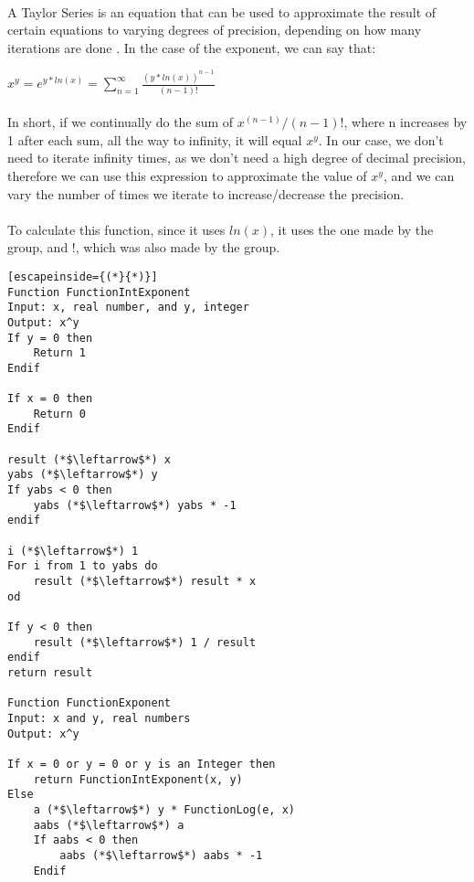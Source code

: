 \begin{itemize}
            \paragraph{}
            A Taylor Series is an equation that can be used to approximate the result of certain equations to varying degrees of precision, depending on how many iterations are done \cite{wikiS}. In the case of the exponent, we can say that:

            \begin{center}
                $x^y = e^{y*ln(x)} = \sum_{n=1}^{\infty}\frac{(y*ln(x))^{n-1}}{(n-1)!}$
            \end{center}

            \paragraph{}
            In short, if we continually do the sum of $x^(n-1)/(n-1)!$, where n increases by 1 after each sum, all the way to infinity, it will equal $x^y$. In our case, we don’t need to iterate infinity times, as we don’t need a high degree of decimal precision, therefore we can use this expression to approximate the value of $x^y$, and we can vary the number of times we iterate to increase/decrease the precision.

            \paragraph{}
        	To calculate this function, since it uses $ln(x)$, it uses the one made by the group, and !, which was also made by the group.

            \begin{lstlisting}[escapeinside={(*}{*)}]
Function FunctionIntExponent
Input: x, real number, and y, integer
Output: x^y
If y = 0 then
	Return 1
Endif

If x = 0 then
	Return 0
Endif

result (*$\leftarrow$*) x
yabs (*$\leftarrow$*) y
If yabs < 0 then
	yabs (*$\leftarrow$*) yabs * -1
endif

i (*$\leftarrow$*) 1
For i from 1 to yabs do
	result (*$\leftarrow$*) result * x
od

If y < 0 then
	result (*$\leftarrow$*) 1 / result
endif
return result

Function FunctionExponent
Input: x and y, real numbers
Output: x^y

If x = 0 or y = 0 or y is an Integer then
	return FunctionIntExponent(x, y)
Else
	a (*$\leftarrow$*) y * FunctionLog(e, x)
	aabs (*$\leftarrow$*) a
	If aabs < 0 then
		aabs (*$\leftarrow$*) aabs * -1
	Endif
	

\end{lstlisting}
\end{itemize}
